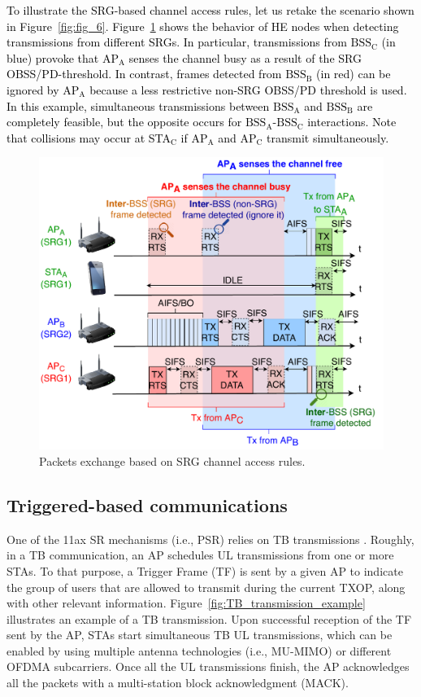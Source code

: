 \documentclass[preprint,12pt]{elsarticle}
\theoremstyle{plain}
\begin{document}
\textcolor{black}{To illustrate the SRG-based channel access rules, let us retake the scenario shown in Figure~\ref{fig:fig_6}. Figure~\ref{fig:srg_channel_access} shows the behavior of HE nodes when detecting transmissions from different SRGs. In particular, transmissions from $\text{BSS}_\text{C}$ (in blue) provoke that $\text{AP}_\text{A}$ senses the channel busy as a result of the SRG OBSS/PD-threshold. In contrast, frames detected from $\text{BSS}_\text{B}$ (in red) can be ignored by $\text{AP}_\text{A}$ because a less restrictive non-SRG OBSS/PD threshold is used. In this example, simultaneous transmissions between $\text{BSS}_\text{A}$ and $\text{BSS}_\text{B}$ are completely feasible, but the opposite occurs for $\text{BSS}_\text{A}$-$\text{BSS}_\text{C}$ interactions. Note that collisions may occur at STA$_\text{C}$ if $\text{AP}_\text{A}$ and $\text{AP}_\text{C}$ transmit simultaneously.}
\begin{figure}[ht!]
	\centering
	\includegraphics[width=.5\columnwidth]{fig_7}
	\caption{Packets exchange based on SRG channel access rules.}
	\label{fig:srg_channel_access}
\end{figure} 

\subsection{Triggered-based communications}
\label{section:tb_communication}
One of the 11ax SR mechanisms (i.e., PSR) relies on TB transmissions \cite{bellalta2019ap}. Roughly, in a TB communication, an AP schedules UL transmissions from one or more STAs. To that purpose, a Trigger Frame (TF) is sent by a given AP to indicate the group of users that are allowed to transmit during the current TXOP, along with other relevant information. Figure~\ref{fig:TB_transmission_example} illustrates an example of a TB transmission. Upon successful reception of the TF sent by the AP, STAs start simultaneous TB UL transmissions, which can be enabled by using multiple antenna technologies (i.e., MU-MIMO) or different OFDMA subcarriers. Once all the UL transmissions finish, the AP acknowledges all the packets with a multi-station block acknowledgment (MACK).
\end{document}
